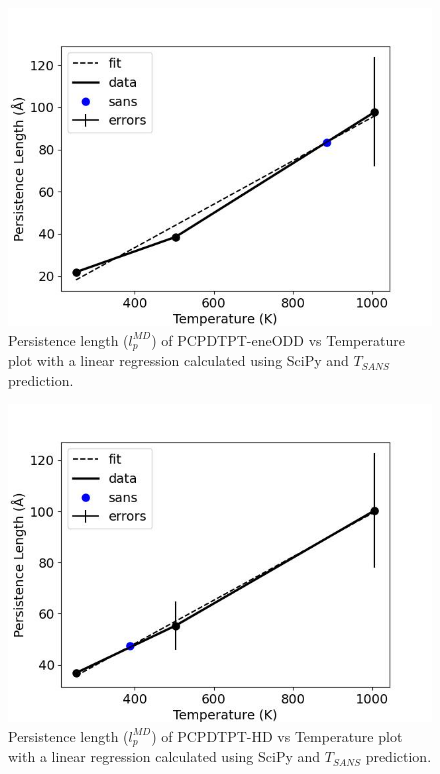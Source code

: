 \begin{figure}
    \centering
    \includegraphics[width=1\linewidth]{src/figures/pers_l_figs/untitled folder/pcpdtpt/eneODD_plot.jpeg}
    \caption{Persistence length ($l_p^{MD}$) of PCPDTPT-eneODD vs Temperature plot with a linear regression calculated using SciPy \citep{2020SciPy-NMeth} and $T_{SANS}$ prediction.}
    \label{fig:eneODD_plot}
\end{figure}

\begin{figure}
    \centering
    \includegraphics[width=1\linewidth]{src/figures/pers_l_figs/untitled folder/pcpdtpt/HD_plot.jpeg}
    \caption{Persistence length ($l_p^{MD}$) of PCPDTPT-HD vs Temperature plot with a linear regression calculated using SciPy \citep{2020SciPy-NMeth} and $T_{SANS}$ prediction.}
    \label{fig:HD_plot}
\end{figure}

